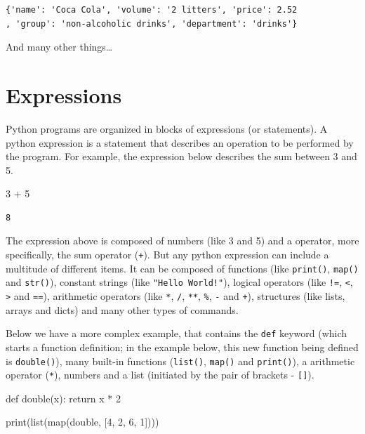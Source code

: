 \documentclass[
  11pt,
  letterpaper,
  DIV=11,
  numbers=noendperiod]{scrreprt}
\newenvironment{Shaded}{\begin{snugshade}}{\end{snugshade}}
\newcommand{\BuiltInTok}[1]{\textcolor[rgb]{0.00,0.23,0.31}{#1}}
\newcommand{\ControlFlowTok}[1]{\textcolor[rgb]{0.00,0.23,0.31}{#1}}
\newcommand{\DecValTok}[1]{\textcolor[rgb]{0.68,0.00,0.00}{#1}}
\newcommand{\KeywordTok}[1]{\textcolor[rgb]{0.00,0.23,0.31}{#1}}
\newcommand{\NormalTok}[1]{\textcolor[rgb]{0.00,0.23,0.31}{#1}}
\newcommand{\OperatorTok}[1]{\textcolor[rgb]{0.37,0.37,0.37}{#1}}
\begin{document}
\begin{verbatim}
{'name': 'Coca Cola', 'volume': '2 litters', 'price': 2.52
, 'group': 'non-alcoholic drinks', 'department': 'drinks'}
\end{verbatim}

And many other things\ldots{}

\hypertarget{expressions}{%
\section{Expressions}\label{expressions}}

Python programs are organized in blocks of expressions (or statements).
A python expression is a statement that describes an operation to be
performed by the program. For example, the expression below describes
the sum between 3 and 5.

\begin{Shaded}
\begin{Highlighting}[]
\DecValTok{3} \OperatorTok{+} \DecValTok{5}
\end{Highlighting}
\end{Shaded}

\begin{verbatim}
8
\end{verbatim}

The expression above is composed of numbers (like 3 and 5) and a
operator, more specifically, the sum operator (\texttt{+}). But any
python expression can include a multitude of different items. It can be
composed of functions (like \texttt{print()}, \texttt{map()} and
\texttt{str()}), constant strings (like \texttt{"Hello\ World!"}),
logical operators (like \texttt{!=}, \texttt{\textless{}},
\texttt{\textgreater{}} and \texttt{==}), arithmetic operators (like
\texttt{*}, \texttt{/}, \texttt{**}, \texttt{\%}, \texttt{-} and
\texttt{+}), structures (like lists, arrays and dicts) and many other
types of commands.

Below we have a more complex example, that contains the \texttt{def}
keyword (which starts a function definition; in the example below, this
new function being defined is \texttt{double()}), many built-in
functions (\texttt{list()}, \texttt{map()} and \texttt{print()}), a
arithmetic operator (\texttt{*}), numbers and a list (initiated by the
pair of brackets - \texttt{{[}{]}}).

\begin{Shaded}
\begin{Highlighting}[]
\KeywordTok{def}\NormalTok{ double(x):}
  \ControlFlowTok{return}\NormalTok{ x }\OperatorTok{*} \DecValTok{2}
  
\BuiltInTok{print}\NormalTok{(}\BuiltInTok{list}\NormalTok{(}\BuiltInTok{map}\NormalTok{(double, [}\DecValTok{4}\NormalTok{, }\DecValTok{2}\NormalTok{, }\DecValTok{6}\NormalTok{, }\DecValTok{1}\NormalTok{])))}
\end{Highlighting}
\end{Shaded}
\end{document}
